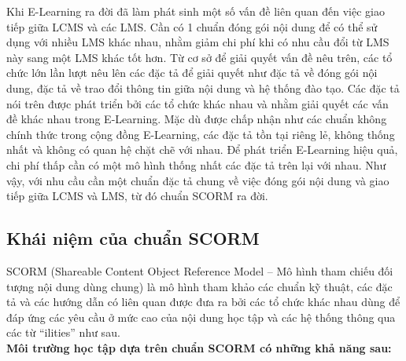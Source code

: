 	Khi E-Learning ra đời đã làm phát sinh một số vấn đề liên quan đến việc giao tiếp giữa LCMS và các LMS. Cần có 1 chuẩn đóng gói nội dung để có thể sử dụng với nhiều LMS khác nhau, nhằm giảm chi phí khi có nhu cầu đổi từ LMS này sang một LMS khác tốt hơn. Từ cơ sở để giải quyết vấn đề nêu trên, các tổ chức lớn lần lượt nêu lên các đặc tả để giải quyết như đặc tả về đóng gói nội dung, đặc tả về trao đổi thông tin giữa nội dung và hệ thống đào tạo. Các đặc tả nói trên được phát triển bởi các tổ chức khác nhau và nhằm giải quyết các vấn đề khác nhau trong E-Learning. Mặc dù được chấp nhận như các chuẩn không chính thức trong cộng đồng E-Learning, các đặc tả tồn tại riêng lẻ, không thống nhất và không có quan hệ chặt chẽ với nhau. Để phát triển E-Learning hiệu quả, chi phí thấp cần có một mô hình thống nhất các đặc tả trên lại với nhau. Như vậy, với nhu cầu cần một chuẩn đặc tả chung về việc đóng gói nội dung và giao tiếp giữa LCMS và LMS, từ đó chuẩn SCORM ra đời.

	\subsection{Khái niệm của chuẩn SCORM}
	
	SCORM (Shareable Content Object Reference Model – Mô hình tham chiếu đối tượng nội dung dùng chung) là mô hình tham khảo các chuẩn kỹ thuật, các đặc tả và các hướng dẫn có liên quan được đưa ra bởi các tổ chức khác nhau dùng để đáp ứng các yêu cầu ở mức cao của nội dung học tập và các hệ thống thông qua các từ “ilities” như sau.\\

	\textbf{Môi trường học tập dựa trên chuẩn SCORM có những khả năng sau:}\\

